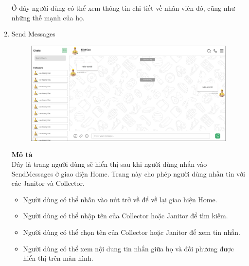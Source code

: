 \documentclass[a4paper]{article}
\begin{document}
\begin{enumerate}
\begin{figure}[!h]
    \end{figure}\\
    \\ Ở đây người dùng có thể xem thông tin chi tiết về nhân viên đó, cũng như những thế mạnh của họ.
    \newpage
    \item Send Messages
    \\
    \begin{figure}[!h]
        \centering
        \includegraphics[width=6in]{Image/Chat-MK.png}
    \end{figure}
    \textbf{Mô tả}\\
    Đây là trang người dùng sẽ hiển thị sau khi người dùng nhấn vào SendMessages ở giao diện Home. Trang này cho phép người dùng nhắn tin với các Janitor và Collector.
    \begin{itemize}
        \item Người dùng có thể nhấn vào nút trở về để về lại giao hiện Home.
        \item Người dùng có thể nhập tên của Collector hoặc Janitor để tìm kiếm.
        \item Người dùng có thể chọn tên của Collector hoặc Janitor để xem tin nhắn.
        \item Người dùng có thể xem nội dung tin nhắn giữa họ và đối phương được hiển thị trên màn hình.
    \end{itemize}
        \\
    \begin{figure}[!h]
        \centering

\end{figure}
\end{enumerate}
\end{document}
